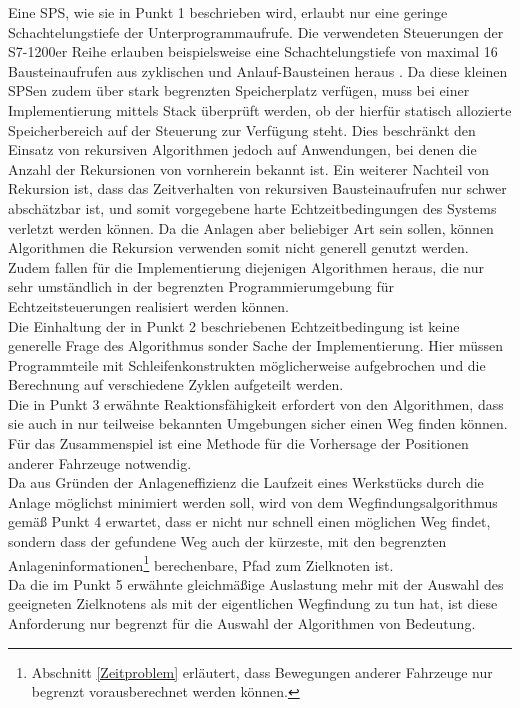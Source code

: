 		Eine \ac{SPS}, wie sie in Punkt 1 beschrieben wird, erlaubt nur eine geringe Schachtelungstiefe der Unterprogrammaufrufe. Die verwendeten Steuerungen der S7-1200er Reihe erlauben beispielsweise eine Schachtelungstiefe von maximal 16 Bausteinaufrufen aus zyklischen und Anlauf-Bausteinen heraus \cite{S7-1200}.  Da diese kleinen \ac{SPS}en zudem über stark begrenzten Speicherplatz verfügen, muss bei einer Implementierung  mittels Stack überprüft werden, ob der hierfür statisch allozierte Speicherbereich auf der Steuerung zur Verfügung steht. Dies beschränkt den Einsatz von rekursiven Algorithmen jedoch auf Anwendungen, bei denen die Anzahl der Rekursionen von vornherein bekannt ist. Ein weiterer Nachteil von Rekursion ist, dass das Zeitverhalten von rekursiven Bausteinaufrufen nur schwer abschätzbar ist, und somit vorgegebene harte Echtzeitbedingungen des Systems verletzt werden können. Da die Anlagen aber beliebiger Art sein sollen, können Algorithmen die Rekursion verwenden somit nicht generell genutzt werden. Zudem fallen für die Implementierung diejenigen Algorithmen heraus, die nur sehr umständlich in der begrenzten Programmierumgebung für Echtzeitsteuerungen realisiert werden können.
		\\[4pt]
		Die Einhaltung der in Punkt 2 beschriebenen Echtzeitbedingung ist keine generelle Frage des Algorithmus sonder Sache der Implementierung. Hier müssen Programmteile mit Schleifenkonstrukten möglicherweise aufgebrochen und die Berechnung auf verschiedene Zyklen aufgeteilt werden.
		\\[4pt]
		Die in Punkt 3 erwähnte Reaktionsfähigkeit erfordert von den Algorithmen, dass sie auch in nur teilweise bekannten Umgebungen sicher einen Weg finden können. Für das Zusammenspiel ist eine Methode für die Vorhersage der Positionen anderer Fahrzeuge notwendig.
		\\[4pt]
		Da aus Gründen der Anlageneffizienz die Laufzeit eines Werkstücks durch die Anlage möglichst minimiert werden soll, wird von dem Wegfindungsalgorithmus gemäß Punkt 4 erwartet, dass er nicht nur schnell einen möglichen Weg findet, sondern dass der gefundene Weg auch der kürzeste, mit den begrenzten Anlageninformationen\footnote{ Abschnitt \ref{Zeitproblem} erläutert, dass Bewegungen anderer Fahrzeuge nur begrenzt vorausberechnet werden können.} berechenbare, Pfad zum Zielknoten ist.
		\\[4pt]
		Da die im Punkt 5 erwähnte gleichmäßige Auslastung mehr mit der Auswahl des geeigneten Zielknotens als mit der eigentlichen Wegfindung zu tun hat, ist diese Anforderung nur begrenzt für die Auswahl der Algorithmen von Bedeutung.
		
